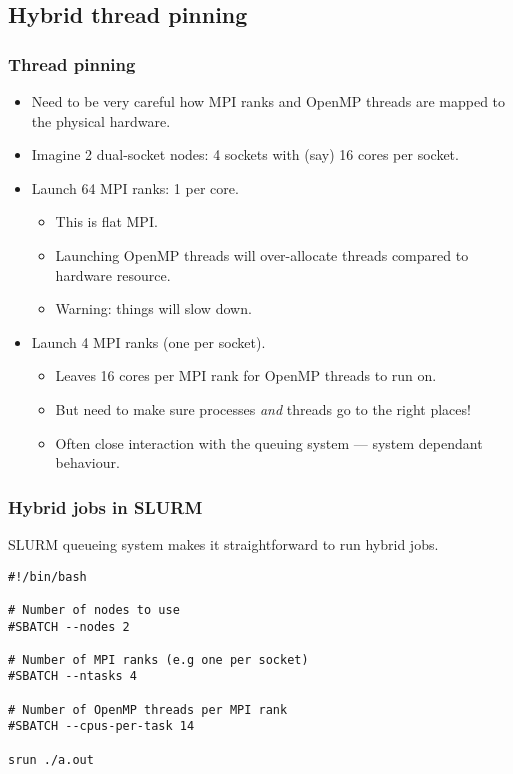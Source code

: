 \documentclass{beamer}
\begin{document}
\subsection{Hybrid thread pinning}
\begin{frame}
\frametitle{Thread pinning}
\begin{itemize}
  \item Need to be very careful how MPI ranks and OpenMP threads are mapped to the physical hardware.
  \item Imagine 2 dual-socket nodes: 4 sockets with (say) 16 cores per socket.
  \item Launch 64 MPI ranks: 1 per core.
    \begin{itemize}
      \item This is flat MPI.
      \item Launching OpenMP threads will over-allocate threads compared to hardware resource.
      \item Warning: things will slow down.
    \end{itemize}
  \item Launch 4 MPI ranks (one per socket).
    \begin{itemize}
      \item Leaves 16 cores per MPI rank for OpenMP threads to run on.
      \item But need to make sure processes \emph{and} threads go to the right places!
      \item Often close interaction with the queuing system --- system dependant behaviour.
    \end{itemize}
\end{itemize}
\end{frame}

\begin{frame}[fragile]
\frametitle{Hybrid jobs in SLURM}

SLURM queueing system makes it straightforward to run hybrid jobs.

\begin{verbatim}
#!/bin/bash

# Number of nodes to use
#SBATCH --nodes 2

# Number of MPI ranks (e.g one per socket)
#SBATCH --ntasks 4

# Number of OpenMP threads per MPI rank
#SBATCH --cpus-per-task 14

srun ./a.out
\end{verbatim}

\end{frame}
\end{document}
